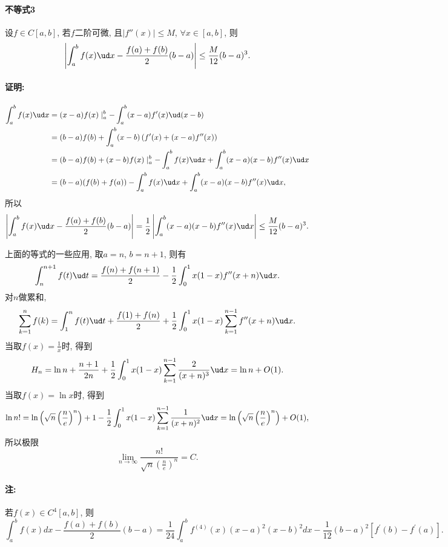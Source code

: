 \paragraph{不等式3}

设$f\in C[a,b]$, 若$f$二阶可微, 且$\left|f''(x)\right|\le M$, $\forall x\in[a,b]$,
则
\[
\left|\int_{a}^{b}f(x)\ud x-\frac{f(a)+f(b)}{2}(b-a)\right|\le\frac{M}{12}(b-a)^{3}.
\]


\paragraph{证明:}

\begin{align*}
\int_{a}^{b}f(x)\ud x & =(x-a)f(x)\mid_{a}^{b}-\int_{a}^{b}(x-a)f'(x)\ud(x-b)\\
 & =(b-a)f(b)+\int_{a}^{b}(x-b)\left(f'(x)+(x-a)f''(x)\right)\\
 & =(b-a)f(b)+(x-b)f(x)\mid_{a}^{b}-\int_{a}^{b}f(x)\ud x+\int_{a}^{b}(x-a)(x-b)f''(x)\ud x\\
 & =(b-a)(f(b)+f(a))-\int_{a}^{b}f(x)\ud x+\int_{a}^{b}(x-a)(x-b)f''(x)\ud x,
\end{align*}
所以
\[
\left|\int_{a}^{b}f(x)\ud x-\frac{f(a)+f(b)}{2}(b-a)\right|=\frac{1}{2}\left|\int_{a}^{b}(x-a)(x-b)f''(x)\ud x\right|\le\frac{M}{12}(b-a)^{3}.
\]

上面的等式的一些应用, 取$a=n$, $b=n+1$, 则有
\[
\int_{n}^{n+1}f(t)\ud t=\frac{f(n)+f(n+1)}{2}-\frac{1}{2}\int_{0}^{1}x(1-x)f''(x+n)\ud x.
\]
对$n$做累和, 
\[
\sum_{k=1}^{n}f(k)=\int_{1}^{n}f(t)\ud t+\frac{f(1)+f(n)}{2}+\frac{1}{2}\int_{0}^{1}x(1-x)\sum_{k=1}^{n-1}f''(x+n)\ud x.
\]
当取$f(x)=\frac{1}{x}$时, 得到
\[
H_{n}=\ln n+\frac{n+1}{2n}+\frac{1}{2}\int_{0}^{1}x(1-x)\sum_{k=1}^{n-1}\frac{2}{(x+n)^{3}}\ud x=\ln n+O(1).
\]
当取$f(x)=\ln x$时, 得到
\[
\ln n!=\ln\left(\sqrt{n}\left(\frac{n}{e}\right)^{n}\right)+1-\frac{1}{2}\int_{0}^{1}x(1-x)\sum_{k=1}^{n-1}\frac{1}{(x+n)^{2}}\ud x=\ln\left(\sqrt{n}\left(\frac{n}{e}\right)^{n}\right)+O(1),
\]
所以极限
\[
\lim_{n\to\infty}\frac{n!}{\sqrt{n}\left(\frac{n}{e}\right)^{n}}=C.
\]


\paragraph{注:}

若$f(x)\in C^{4}[a,b]$, 则
\[
\int_{a}^{b}f(x)dx-\frac{f(a)+f(b)}{2}(b-a)=\frac{1}{24}\int_{a}^{b}f^{(4)}(x)(x-a)^{2}(x-b)^{2}dx-\frac{1}{12}(b-a)^{2}\left[f^{\prime}(b)-f^{\prime}(a)\right].
\]


